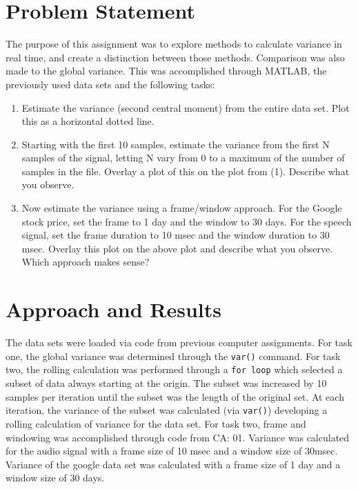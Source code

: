  
\usepackage{mcode}


\maketitle %

\section{Problem Statement} 
The purpose of this assignment was to explore methods to calculate  variance in real time, and create a distinction between those methods. Comparison was also made to the global variance. This was accomplished through MATLAB, the previously used data sets and the following tasks: 
\begin{enumerate}
\item Estimate the variance (second central moment) from the entire data set. Plot this as a horizontal dotted line.
\item Starting with the first 10 samples, estimate the variance from the first N samples of the signal, letting N vary from 0 to a maximum of the number of samples in the file. Overlay a plot of this on the plot from (1). Describe what you observe.
\item Now estimate the variance using a frame/window approach. For the Google stock price, set the frame to 1 day and the window to 30 days. For the speech signal, set the frame duration to 10 msec and the window duration to 30 msec. Overlay this plot on the above plot and describe what you observe. Which approach makes sense?
\end{enumerate}

\section{Approach and Results} 
The data sets were loaded via code from previous computer assignments. For task one, the global variance was determined through the \verb|var()| command. For task two, the rolling calculation was performed through a \verb|for loop| which selected a subset of data always starting at the origin. The subset was increased by 10 samples per iteration until the subset was the length of the original set. At each iteration, the variance of the subset was calculated (via \verb|var()|) developing a rolling calculation of variance for the data set. For task two, frame and windowing was accomplished through code from CA: 01. Variance was calculated for the audio signal with a frame size of 10 msec and a window size of 30msec.  Variance of the google data set was calculated with a frame size of 1 day and a window size of 30 days. \\ 

